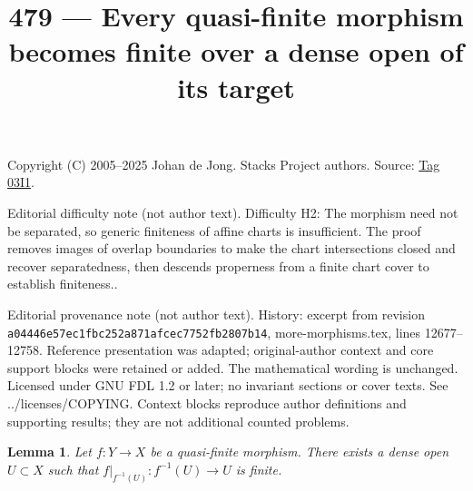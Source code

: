 \documentclass{amsart}
\theoremstyle{plain}
\newtheorem{lemma}[subsection]{Lemma}
\theoremstyle{definition}
\theoremstyle{remark}
\numberwithin{equation}{subsection}
\begin{document}
\title[Stacks Project, Tag 03I1]{479 --- Every quasi-finite morphism becomes finite over a dense open of its target}
\maketitle
\noindent Copyright (C) 2005--2025 Johan de Jong. Stacks Project authors. Source: \href{https://stacks.math.columbia.edu/tag/03I1}{Tag 03I1}.

\noindent Editorial difficulty note (not author text). Difficulty H2: The morphism need not be separated, so generic finiteness of affine charts is insufficient. The proof removes images of overlap boundaries to make the chart intersections closed and recover separatedness, then descends properness from a finite chart cover to establish finiteness..

\noindent Editorial provenance note (not author text). History: excerpt from revision \texttt{a0444\allowbreak 6e57e\allowbreak c1fbc\allowbreak 252a8\allowbreak 71afc\allowbreak ec775\allowbreak 2fb28\allowbreak 07b14}, more-morphisms.tex, lines 12677--12758. Reference presentation was adapted; original-author context and core support blocks were retained or added. The mathematical wording is unchanged. Licensed under GNU FDL 1.2 or later; no invariant sections or cover texts. See ../licenses/COPYING. Context blocks reproduce author definitions and supporting results; they are not additional counted problems.

\begin{lemma}
\label{lemma-quasi-finite-finite-over-dense-open}
Let $f : Y \to X$ be a quasi-finite morphism.
There exists a dense open $U \subset X$ such that
$f|_{f^{-1}(U)} : f^{-1}(U) \to U$ is finite.
\end{lemma}
\end{document}
